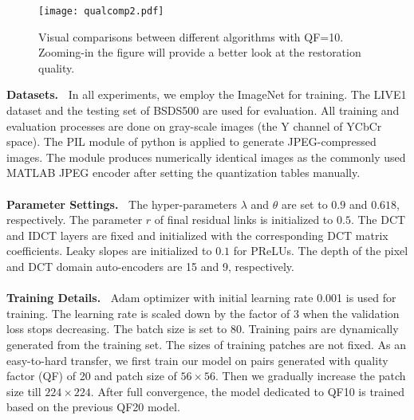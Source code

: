 \documentclass{article}
\begin{document}
\begin{figure*}[htb]
  \vspace{-0.5cm}
  \begin{minipage}[b]{1.0\linewidth}
    \centering
    \centerline{\texttt{[image: qualcomp2.pdf]}}
    \caption{Visual comparisons between different algorithms with QF=10.
    Zooming-in the figure will provide a better look at the restoration quality.}\medskip
    \label{fig:f3}
    \vspace{-0.7cm}
  \end{minipage}
\end{figure*}

\textbf{Datasets.\ }
In all experiments, we employ the ImageNet \cite{ILSVRC15} for training.
The LIVE1 dataset and the testing set of BSDS500 are used for evaluation.
All training and evaluation processes are done on gray-scale images
(the Y channel of YCbCr space). The PIL module of python is applied to
generate JPEG-compressed images. The module produces numerically identical images
as the commonly used MATLAB JPEG encoder after setting the quantization tables manually.
\vspace{-0.1cm}
\\\\
\textbf{Parameter Settings.\ }
The hyper-parameters $\lambda$ and $\theta$ are set to $0.9$ and $0.618$,
respectively. The parameter $r$ of final residual links is initialized
to $0.5$. The DCT and IDCT layers are fixed and initialized with the
corresponding DCT matrix coefficients. Leaky slopes are initialized
to $0.1$ for PReLUs. The depth of the pixel and DCT domain auto-encoders
are 15 and 9, respectively.
\vspace{-0.1cm}
\\\\
\textbf{Training Details.\ }
Adam optimizer with initial learning rate 0.001 is used for training.
The learning rate is scaled down by the factor of 3 when
the validation loss stops decreasing. The batch size is set to 80.
Training pairs are dynamically generated from the training set. The sizes of
training patches are not fixed. As an easy-to-hard transfer, we first train
our model on pairs generated with quality factor (QF) of 20 and patch size
of $56 \times 56$. Then we gradually increase the patch size
till $224 \times 224$. After full convergence, the model
dedicated to QF10 is trained based on the previous QF20 model.  \\\\
\vspace{-1.1cm}
\end{document}
